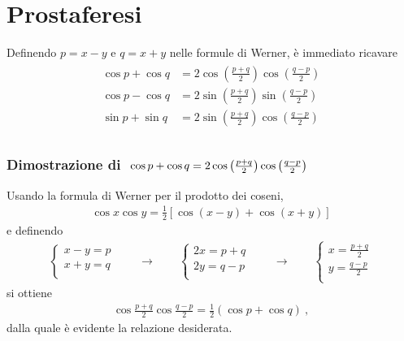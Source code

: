 \documentclass[letterpaper,10pt,english]{jupyterBook}
\begin{document}
\section{Prostaferesi}
\label{\detokenize{ch/trigonometry:prostaferesi}}
\sphinxAtStartPar
Definendo \(p = x-y\) e \(q = x+y\) nelle formule di Werner, è immediato ricavare
\begin{equation*}
\begin{split}\begin{aligned}
  \cos p + \cos q & = 2 \cos\left(\frac{p+q}{2} \right) \cos\left(\frac{q-p}{2} \right) \\
  \cos p - \cos q & = 2 \sin\left(\frac{p+q}{2} \right) \sin\left(\frac{q-p}{2} \right) \\
  \sin p + \sin q & = 2 \sin\left(\frac{p+q}{2} \right) \cos\left(\frac{q-p}{2} \right) \\
\end{aligned}\end{split}
\end{equation*}\subsubsection*{Dimostrazione di \protect\(\ \cos p + \cos q = 2 \cos\left(\frac{p+q}{2} \right) \cos\left(\frac{q-p}{2} \right)\protect\)}

\sphinxAtStartPar
Usando la formula di Werner per il prodotto dei coseni,
\begin{equation*}
\begin{split}\cos x \cos y = \frac{1}{2} \left[ \cos(x-y) + \cos(x+y) \right]\end{split}
\end{equation*}
\sphinxAtStartPar
e definendo
\begin{equation*}
\begin{split}\begin{cases}
  x-y = p \\
  x+y = q \\
\end{cases}
\qquad \rightarrow \qquad
\begin{cases}
  2 x = p + q \\
  2 y = q - p \\
\end{cases}
\qquad \rightarrow \qquad
\begin{cases}
  x = \frac{ p + q }{2} \\
  y = \frac{ q - p }{2} \\
\end{cases}
\end{split}
\end{equation*}
\sphinxAtStartPar
si ottiene
\begin{equation*}
\begin{split}\cos \frac{p+q}{2} \cos\frac{q-p}{2} = \frac{1}{2} \left( \cos p + \cos q \right) \ ,\end{split}
\end{equation*}
\sphinxAtStartPar
dalla quale è evidente la relazione desiderata.
\end{document}
